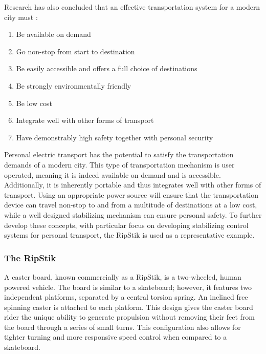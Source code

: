 Research has also concluded that an effective transportation system for a modern city must \cite{SustainableTransport}:

\begin{enumerate}
	\item Be available on demand
	\item Go non-stop from start to destination
	\item Be easily accessible and offers a full choice of destinations
	\item Be strongly environmentally friendly
	\item Be low cost
	\item Integrate well with other forms of transport
	\item Have demonstrably high safety together with personal security
\end{enumerate}

Personal electric transport has the potential to satisfy the transportation demands of a modern city. 
This type of transportation mechanism is user operated, meaning it is indeed available on demand and is accessible. 
Additionally, it is inherently portable and thus integrates well with other forms of transport. 
Using an appropriate power source will ensure that the transportation device can travel non-stop to and from a multitude of destinations at a low cost, while a well designed stabilizing mechanism can ensure personal safety. 
To further develop these concepts, with particular focus on developing stabilizing control systems for personal transport, the RipStik is used as a representative example.

\subsubsection{The RipStik}

A caster board, known commercially as a RipStik, is a two-wheeled, human powered vehicle. 
The board is similar to a skateboard; however, it features two independent platforms, separated by a central torsion spring.
An inclined free spinning caster is attached to each platform. 
This design gives the caster board rider the unique ability to generate propulsion without removing their feet from the board through a series of small turns. 
This configuration also allows for tighter turning and more responsive speed control when compared to a skateboard. 

